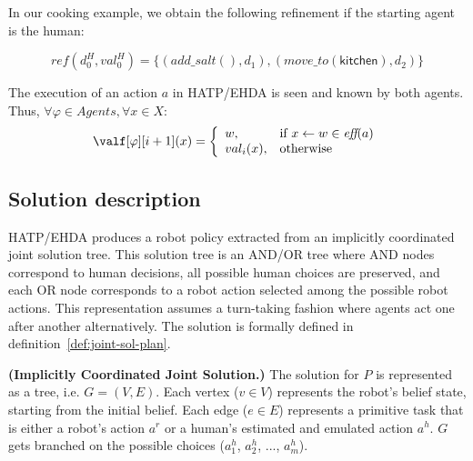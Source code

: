 
In our cooking example, we obtain the following refinement if the starting agent is the human:

\begin{equation*}
    ref(d^H_0, val^H_0) = \{ (add\_salt(),d_1), (move\_to(\textsf{kitchen}),d_2) \}
\end{equation*}

The execution of an action $a$ in HATP/EHDA is seen and known by both agents. Thus, $\forall \varphi \in Agents, \forall x \in X$: 
\begin{equation*}
    \valf[\varphi][i+1](x) = \left\{ 
    \begin{array}{ll}
        w, & \mbox{if} ~ x \leftarrow w \in \textit{eff}(a)   \\ 
        val_i(x), & \mbox{otherwise}
    \end{array}\right.
\end{equation*}


\subsection*{Solution description}

HATP/EHDA produces a robot policy extracted from an implicitly coordinated joint solution tree. This solution tree is an AND/OR tree where AND nodes correspond to human decisions, all possible human choices are preserved, and each OR node corresponds to a robot action selected among the possible robot actions. This representation assumes a turn-taking fashion where agents act one after another alternatively. The solution is formally defined in definition~\ref{def:joint-sol-plan}.

\begin{definition} 
    \label{def:joint-sol-plan}
    \textbf{(Implicitly Coordinated Joint Solution.)} 
    {The solution for $P$ is represented as a tree, i.e. $G=(V,E)$. Each vertex ($v \in V$) represents the robot's belief state, starting from the initial belief. Each edge ($e \in E$) represents a primitive task that is either a robot's action $a^{r}$ or a human's estimated and emulated action $a^{h}$. $G$ gets branched on the possible choices ($a^{h}_1$, $a^{h}_2$, ..., $a^{h}_m$). 
    }  
    \end{definition}
    
